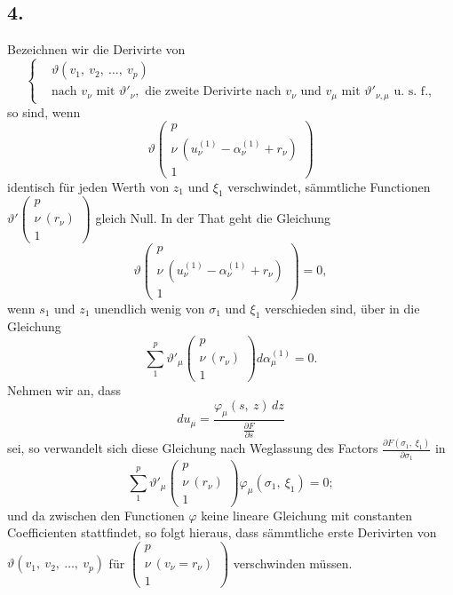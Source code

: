 \documentclass[12pt,a4paper]{article}
\begin{document}
\subsection*{4.}

Bezeichnen wir die Derivirte von
\begin{equation}
\tag{1}
\left\{
\begin{aligned}
&\vartheta(v_1,\ v_2,\ \ldots,\ v_p)\\
&\text{nach } v_\nu \text{ mit } \vartheta'_\nu, \text{ die zweite Derivirte nach } v_\nu \text{ und } v_\mu \text{ mit } \vartheta'_{\nu,\mu} \text{ u.~s.~f.,}
\end{aligned}
\right.
\end{equation}
so sind, wenn
\[ \vartheta\left(\begin{array}{c} p\\ \nu\ (u_\nu^{(1)} - \alpha_\nu^{(1)} + r_\nu)\\ 1 \end{array}\right) \]
identisch für jeden Werth von $z_1$ und $\xi_1$ verschwindet, sämmtliche Functionen $\vartheta'\left(\begin{array}{c} p\\ \nu\ (r_\nu)\\ 1 \end{array}\right)$ gleich Null. In der That geht die Gleichung
\[ \vartheta\left(\begin{array}{c} p\\ \nu\ (u_\nu^{(1)} - \alpha_\nu^{(1)} + r_\nu)\\ 1 \end{array}\right) = 0, \]
 wenn $s_1$ und $z_1$ unendlich wenig von $\sigma_1$ und $\xi_1$ verschieden sind, über in die Gleichung
\[ \sum_1^p \vartheta'_\mu\left(\begin{array}{c} p\\ \nu\ (r_\nu)\\ 1 \end{array}\right) d\alpha_\mu^{(1)} = 0. \]
Nehmen wir an, dass
\[ du_\mu = \frac{\varphi_\mu(s,\ z)\,dz}{\frac{\partial F}{\partial s}} \]
sei, so verwandelt sich diese Gleichung nach Weglassung des Factors $\frac{\partial F(\sigma_1,\ \xi_1)}{\partial \sigma_1}$ in
\[ \sum_1^p \vartheta'_\mu\left(\begin{array}{c} p\\ \nu\ (r_\nu)\\ 1 \end{array}\right) \varphi_\mu(\sigma_1,\ \xi_1) = 0; \]
und da zwischen den Functionen $\varphi$ keine lineare Gleichung mit constanten Coefficienten stattfindet, so folgt hieraus, dass sämmtliche erste Derivirten von $\vartheta(v_1,\ v_2,\ \ldots,\ v_p)$ für $\left(\begin{array}{c} p\\ \nu\ (v_\nu = r_\nu)\\ 1 \end{array}\right)$ verschwinden müssen.
\end{document}
